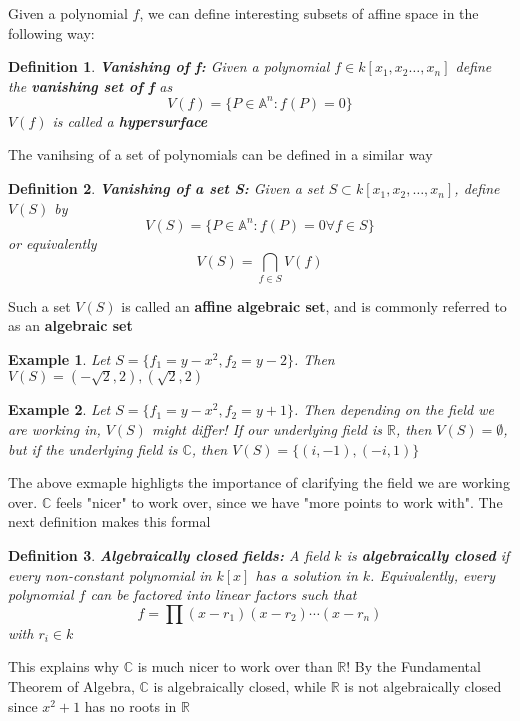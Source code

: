 \documentclass{article}
\newtheorem{definition}{Definition}[section]
\newtheorem{exmp}{Example}[section]
\begin{document}
Given a polynomial $f$, we can define interesting subsets of affine space in the following way:

\begin{definition}
    \textbf{Vanishing of f:} Given a polynomial \(f \in k[x_1, x_2 \ldots ,x_n]\) define the \textbf{vanishing set of f} as
    \[ V(f) = \{  P \in \mathbb{A}^n : f(P) = 0      \} \] 
    \( V(f) \) is called a \textbf{hypersurface}
\end{definition}

The vanihsing of a set of polynomials can be defined in a similar way
\begin{definition}
    \textbf{Vanishing of a set S:} Given a set \( S \subset k[x_1, x_2, \ldots, x_n]\), define $V(S)$ by 
    \[ V(S) = \{P \in \mathbb{A}^n : f(P) = 0 \forall f \in S\} \] or equivalently
    \[  V(S) = \bigcap_{f \in S} V(f)\]
\end{definition} Such a set $V(S)$ is called an \textbf{affine algebraic set}, and is commonly referred to as an \textbf{algebraic set}

\begin{exmp}
    Let \(S = \{f_1 = y-x^2, f_2 = y-2\}\). Then \(V(S) = { (-\sqrt{2}, 2), (\sqrt{2}, 2)  }\)
\end{exmp}

\begin{exmp}
    Let \(S = \{f_1 = y - x^2, f_2 = y+1\}\). Then depending on the field we are working in, $V(S)$ might differ! If our underlying field is $\mathbb{R}$, then $V(S) = \emptyset$,
    but if the underlying field is $\mathbb{C}$, then $V(S) = \{ (i, -1), (-i, 1)\}$
\end{exmp}
The above exmaple highligts the importance of clarifying the field we are working over. $\mathbb{C}$ feels "nicer" to work over, since we have "more points to work with". The next definition
makes this formal

\begin{definition}
    \textbf{Algebraically closed fields:} A field $k$ is \textbf{algebraically closed} if every non-constant polynomial in $k[x]$ has a solution in $k$. Equivalently, every polynomial $f$ can be 
    factored into linear factors such that
    \[ f = \prod (x-r_1)(x-r_2) \cdots (x-r_n)\] with $r_i \in k$


\end{definition}    

This explains why $\mathbb{C}$ is much nicer to work over than $\mathbb{R}$! By the Fundamental Theorem of Algebra, $\mathbb{C}$ is algebraically closed, while $\mathbb{R}$ is not 
algebraically closed since $x^2+1$ has no roots in $\mathbb{R}$
\end{document}
